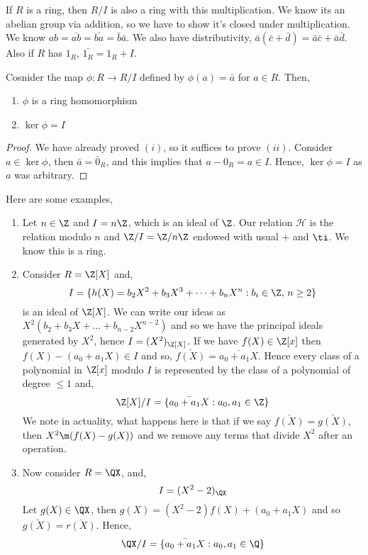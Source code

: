  \noindent
 If $R$ is a ring, then $R/I$ is also a ring with this multiplication. We know its an abelian group via addition, so we have to show it's closed under multiplication. We know $ab = \bar{ab} = \bar{ba} =\bar{b}\bar{a}$. We also have distributivity, $\bar a (\bar c + \bar d) = \bar a \bar c + \bar a \bar d$. Also if $R$ has $1_R$, $\bar{1_R} = 1_R + I$.

\begin{nlemma}
  Cosnider the map $\phi : R \to R/I$ defined by $\phi(a) = \bar a$ for $a \in R$. Then,
  \begin{enumerate}
    \item $\phi$ is a ring homomorphism
    \item $\ker \phi = I$
  \end{enumerate}
\end{nlemma}
\begin{proof}
  We have already proved $(i)$, so it suffices to prove $(ii)$. Consider $a \in \ker\phi$, then $\bar a = \bar 0_R$, and this implies that $a - 0_R = a \in I$. Hence, $\ker \phi = I$ as $a$ was arbitrary.
\end{proof}

\begin{eg}
  Here are some examples,
  \begin{enumerate}
    \item Let $n \in \Z$ and $I = n\Z$, which is an ideal of $\Z$. Our relation $\mathcal{H}$ is the relation modulo $n$ and $\Z/I = \Z/n\Z$ endowed with usual $+$ and $\ti$. We know this is a ring.
    \item Consider $R = \Z[X]$ and,
    $$ I = \{h(X) = b_2X^2 + b_3X^3 + \dots + b_nX^n : b_i \in \Z,\, n\ge 2\} $$
    is an ideal of $\Z[X]$. We can write our ideas as $X^2(b_2 + b_3X + \dots + b_{n-2}X^{n-2})$ and so we have the principal ideals generated by $X^2$, hence $I = (X^2)_{\Z[X]}$. If we have $f(X) \in \Z[x]$ then $f(X) - (a_0 + a_1X) \in I$ and so, $\bar{f(X)} = \bar{a_0 + a_1X}$. Hence every class of a polynomial in $\Z[x]$ modulo $I$ is represented by the class of a polynomial of degree $\le 1$ and,
    $$ \Z[X]/I = \{\bar{a_0 + a_1X} : a_0,a_1 \in \Z\} $$
    We note in actuality, what happens here is that if we say $\bar{f(X)} = \bar{g(X)}$, then $X^2 \m (f(X) - g(X))$ and we remove any terms that divide $X^2$ after an operation.
    \item Now consider $R = \QX$, and,
    $$ I = (X^2 - 2)_{\QX} $$
    Let $g(X) \in \QX$, then $g(X) = (X^2 - 2)f(X) + (a_0 + a_1X)$ and so $\bar{g(X)} = \bar{r(X)}$. Hence,
    $$ \QX/I = \{\bar{a_0 + a_1X} : a_0, a_1 \in \Q\} $$
  \end{enumerate}
\end{eg}
